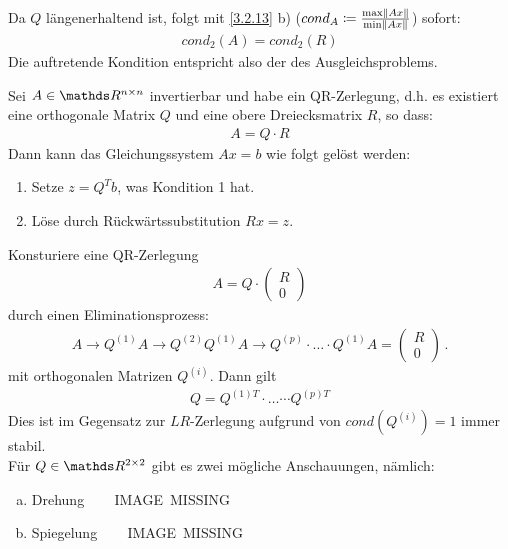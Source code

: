 Da $Q$ längenerhaltend ist, folgt mit \ref{3.2.13} b)
($cond_A \coloneqq \frac{\max \left\| Ax \right\|}{\min \left\| Ax \right\|}$)
sofort:
\begin{gather*}
cond_2(A) = cond_2(R)
\end{gather*}
Die auftretende Kondition entspricht also der des Ausgleichsproblems.


\begin{Beme}
	Sei $A\in \Renn$ invertierbar und habe ein QR-Zerlegung, d.h. es existiert
	eine orthogonale Matrix $Q$ und eine obere Dreiecksmatrix $R$, so dass:
	\begin{gather*}
	A= Q\cdot R
	\end{gather*}
	Dann kann das Gleichungssystem $Ax=b$ wie folgt gelöst werden:
	\begin{enumerate}[1.]
		\item Setze $z=Q^Tb$, was Kondition 1 hat.
		\item Löse durch Rückwärtssubstitution $Rx=z$.
	\end{enumerate}
\end{Beme}



Konsturiere eine QR-Zerlegung
\begin{gather}
A= Q\cdot \begin{pmatrix} R\\0 \end{pmatrix}
\label{IV.4.1}
\end{gather}
durch einen Eliminationsprozess:
\begin{gather}
A \rightarrow Q^{(1)}A \rightarrow Q^{(2)} Q^{(1)}A \rightarrow Q^{(p)}\cdot \dotsc \cdot Q^{(1)}A
= \begin{pmatrix} R\\0 \end{pmatrix}\, .
\label{IV.4.2}
\end{gather}
mit orthogonalen Matrizen $Q^{(i)}$.
Dann gilt
\begin{gather}
Q= Q^{(1)T}\cdot \dotsc \cdots {Q^{(p)T}}
\label{IV.4.3}
\end{gather}
Dies ist im Gegensatz zur $LR$-Zerlegung aufgrund von $cond(Q^{(i)})= 1$ immer stabil.\\

Für $Q\in\R^{2\times 2}$ gibt es zwei mögliche Anschauungen, nämlich:
\begin{enumerate}[a)]
	\item Drehung ~~~ IMAGE~MISSING\label{im4.4(1)}
	\item Spiegelung ~~~ IMAGE~MISSING\label{im4.4(2)}
\end{enumerate}


